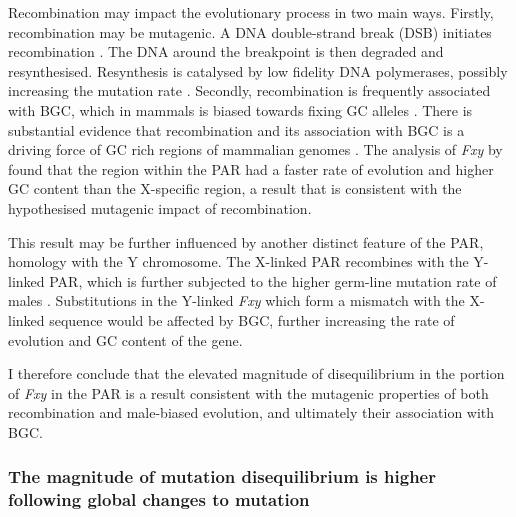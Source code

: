 Recombination may impact the evolutionary process in two main ways. Firstly, recombination may be mutagenic. A DNA double-strand break (DSB) initiates recombination \citep{Keeney2001MechanismInitiation}. The DNA around the breakpoint is then degraded and resynthesised. Resynthesis is catalysed by low fidelity DNA polymerases, possibly increasing the mutation rate \citep{Rattray2003Error-proneAhead}. Secondly, recombination is frequently associated with \acrshort{BGC}, which in mammals is biased towards fixing GC alleles \citep{Birdsell2002IntegratingEvolution, Eyre-Walker1999EvidenceDNA., Mancera2008High-resolutionYeast}. There is substantial evidence that recombination and its association with BGC is a driving force of GC rich regions of mammalian genomes \citep{Meunier2004RecombinationGenome, Berglund2009HotspotsGenes,Galtier2009GC-biasedPrimates}. The analysis of \textit{Fxy} by \cite{Montoya-Burgos2003RecombinationGenomes} found that the region within the PAR had a faster rate of evolution and higher GC content than the X-specific region, a result that is consistent with the hypothesised mutagenic impact of recombination. 

This result may be further influenced by another distinct feature of the PAR, homology with the Y chromosome. The X-linked PAR recombines with the Y-linked PAR, which is further subjected to the higher germ-line mutation rate of males \citep{Huttley2000HowMutagenesis}. Substitutions in the Y-linked \textit{Fxy} which form a mismatch with the X-linked sequence would be affected by BGC, further increasing the rate of evolution and GC content of the gene. 

I therefore conclude that the elevated magnitude of disequilibrium in the portion of \textit{Fxy} in the PAR is a result consistent with the mutagenic properties of both recombination and male-biased evolution, and ultimately their association with BGC. 

\subsubsection{The magnitude of mutation disequilibrium is higher following global changes to mutation}

